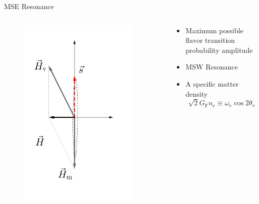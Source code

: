 \begin{frame}{MSE Resonance}


\begin{columns}[T]
\begin{column}{0.5\textwidth}



\begin{figure}
    \centering
    \colorbox{white}{\includegraphics[width=0.9\textwidth]{assets/matter-effect-critical-density}}
\end{figure}


\end{column}%
\begin{column}{0.5\textwidth}



\begin{itemize}
\item
Maximum possible flavor transition probability amplitude
\item
MSW Resonance
\item
A specific matter density
\begin{equation*}
    \sqrt{2}G_{\mathrm F}n_{\mathrm e} \equiv \omega_{\mathrm v}\cos 2\theta_{\mathrm v}
\end{equation*}



\end{itemize}
\end{column}
\end{columns}
\end{frame}
